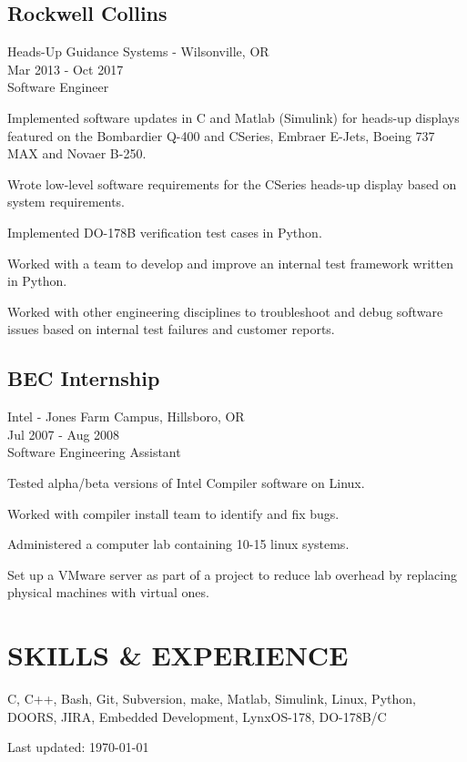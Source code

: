 \documentclass{article}
\newcommand{\skills}{C, C++,  Bash, Git, Subversion, make, Matlab, Simulink, Linux, Python, DOORS, JIRA, Embedded Development, LynxOS-178, DO-178B/C }
\renewenvironment{itemize}{
	\begin{list}{}{
		\setlength{\leftmargin}{1.5em}
		\setlength{\itemsep}{0.25em}
		\setlength{\parskip}{0pt}
		\setlength{\parsep}{0.25em}
	}
}{
	\end{list}
}
\begin{document}
	\begin{minipage}[t]{0.5\textwidth}
	\subsection*{Rockwell Collins}
		Heads-Up Guidance Systems - Wilsonville, OR \\
		Mar 2013 - Oct 2017 \\
		Software Engineer

		\begin{itemize}
			\item Implemented software updates in C and Matlab (Simulink) for heads-up displays featured on the Bombardier Q-400 and CSeries, Embraer E-Jets, Boeing 737 MAX and Novaer B-250.
			\item Wrote low-level software requirements for the CSeries heads-up display based on system requirements.
			\item Implemented DO-178B verification test cases in Python.
			\item Worked with a team to develop and improve an internal test framework written in Python.
			\item Worked with other engineering disciplines to troubleshoot and debug software issues based on internal test failures and customer reports. 
		\end{itemize}
	\end{minipage}
	\hspace{2 mm}
	\begin{minipage}[t]{0.5\textwidth}
	\subsection*{BEC Internship}
		Intel - Jones Farm Campus, Hillsboro, OR \\
		Jul 2007 - Aug 2008 \\
		Software Engineering Assistant

		\begin{itemize}
			\item Tested alpha/beta versions of Intel Compiler software on Linux.
			\item Worked with compiler install team to identify and fix bugs.
			\item Administered a computer lab containing 10-15 linux systems.
			\item Set up a VMware server as part of a project to reduce lab overhead by
				replacing physical machines with virtual ones.
		\end{itemize}
	\end{minipage}


\section*{SKILLS \& EXPERIENCE}
	\skills

\begin{center}
	\begin{small}
		Last updated: \today
	\end{small}
\end{center}
\end{document}
